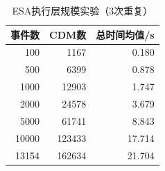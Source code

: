 \begin{table}[t]
\centering
\caption{ESA执行层规模实验（3次重复）}
\label{tab:esa-scale}
\scriptsize
\begin{tabular}{rrr}
\toprule
事件数 & CDM数 & 总时间均值/s\\
\midrule
100 & 1167 & 0.180\\
500 & 6399 & 0.878\\
1000 & 12903 & 1.747\\
2000 & 24578 & 3.679\\
5000 & 61741 & 8.843\\
10000 & 123433 & 17.714\\
13154 & 162634 & 21.704\\
\bottomrule
\end{tabular}
\end{table}
